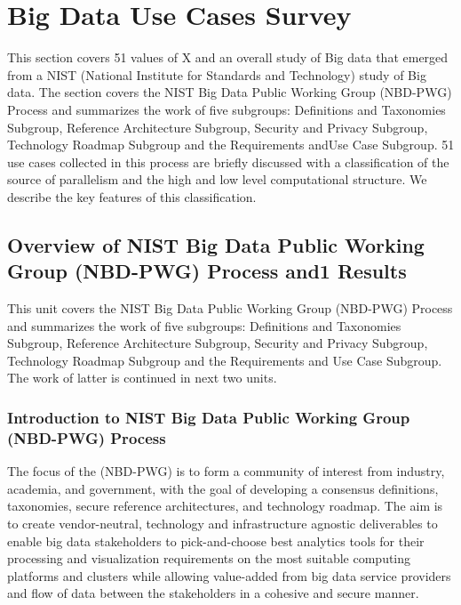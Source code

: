 \begin{fileremark}\currfiledir \currfilename\end{fileremark}

\section{Big Data Use Cases Survey}\label{big-data-use-cases-survey}

This section covers 51 values of X and an overall study of Big data that
emerged from a NIST (National Institute for Standards and Technology)
study of Big data. The section covers the NIST Big Data Public Working
Group (NBD-PWG) Process and summarizes the work of five subgroups:
Definitions and Taxonomies Subgroup, Reference Architecture Subgroup,
Security and Privacy Subgroup, Technology Roadmap Subgroup and the
Requirements andUse Case Subgroup. 51 use cases collected in this
process are briefly discussed with a classification of the source of
parallelism and the high and low level computational structure. We
describe the key features of this classification.

\subsection{Overview of NIST Big Data Public Working Group (NBD-PWG)
Process and1
Results}\label{overview-of-nist-big-data-public-working-group-nbd-pwg-process-and-results}

This unit covers the NIST Big Data Public Working Group (NBD-PWG)
Process and summarizes the work of five subgroups: Definitions and
Taxonomies Subgroup, Reference Architecture Subgroup, Security and
Privacy Subgroup, Technology Roadmap Subgroup and the Requirements and
Use Case Subgroup. The work of latter is continued in next two units.




\subsubsection{Introduction to NIST Big Data Public Working Group
(NBD-PWG)
Process}\label{introduction-to-nist-big-data-public-working-group-nbd-pwg-process}

The focus of the (NBD-PWG) is to form a community of interest from
industry, academia, and government, with the goal of developing a
consensus definitions, taxonomies, secure reference architectures, and
technology roadmap. The aim is to create vendor-neutral, technology and
infrastructure agnostic deliverables to enable big data stakeholders to
pick-and-choose best analytics tools for their processing and
visualization requirements on the most suitable computing platforms and
clusters while allowing value-added from big data service providers and
flow of data between the stakeholders in a cohesive and secure manner.


